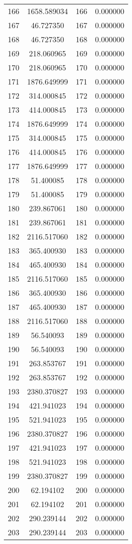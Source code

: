 \documentclass[12pt]{article}
\begin{document}
\begin{longtable}{@{}cccc@{}}
166 & 1658.589034 & 166 & 0.000000 \\
167 & 46.727350 & 167 & 0.000000 \\
168 & 46.727350 & 168 & 0.000000 \\
169 & 218.060965 & 169 & 0.000000 \\
170 & 218.060965 & 170 & 0.000000 \\
171 & 1876.649999 & 171 & 0.000000 \\
172 & 314.000845 & 172 & 0.000000 \\
173 & 414.000845 & 173 & 0.000000 \\
174 & 1876.649999 & 174 & 0.000000 \\
175 & 314.000845 & 175 & 0.000000 \\
176 & 414.000845 & 176 & 0.000000 \\
177 & 1876.649999 & 177 & 0.000000 \\
178 & 51.400085 & 178 & 0.000000 \\
179 & 51.400085 & 179 & 0.000000 \\
180 & 239.867061 & 180 & 0.000000 \\
181 & 239.867061 & 181 & 0.000000 \\
182 & 2116.517060 & 182 & 0.000000 \\
183 & 365.400930 & 183 & 0.000000 \\
184 & 465.400930 & 184 & 0.000000 \\
185 & 2116.517060 & 185 & 0.000000 \\
186 & 365.400930 & 186 & 0.000000 \\
187 & 465.400930 & 187 & 0.000000 \\
188 & 2116.517060 & 188 & 0.000000 \\
189 & 56.540093 & 189 & 0.000000 \\
190 & 56.540093 & 190 & 0.000000 \\
191 & 263.853767 & 191 & 0.000000 \\
192 & 263.853767 & 192 & 0.000000 \\
193 & 2380.370827 & 193 & 0.000000 \\
194 & 421.941023 & 194 & 0.000000 \\
195 & 521.941023 & 195 & 0.000000 \\
196 & 2380.370827 & 196 & 0.000000 \\
197 & 421.941023 & 197 & 0.000000 \\
198 & 521.941023 & 198 & 0.000000 \\
199 & 2380.370827 & 199 & 0.000000 \\
200 & 62.194102 & 200 & 0.000000 \\
201 & 62.194102 & 201 & 0.000000 \\
202 & 290.239144 & 202 & 0.000000 \\
203 & 290.239144 & 203 & 0.000000 \\

\end{longtable}
\end{document}
